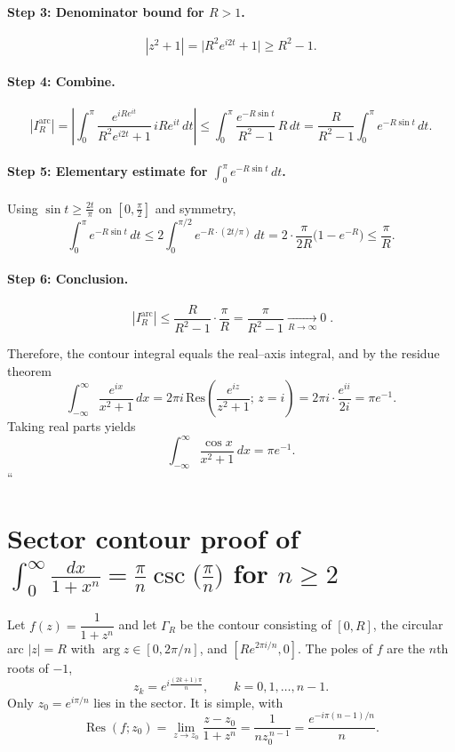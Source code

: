 \documentclass[12pt,a4paper]{article}
\begin{document}
\paragraph{Step 3: Denominator bound for \(R>1\).}
\[
|z^{2}+1|=\bigl|R^{2}e^{i2t}+1\bigr|\ge R^{2}-1 .
\]

\paragraph{Step 4: Combine.}
\[
\left|I_R^{\mathrm{arc}}\right|
=\left|\int_{0}^{\pi}\frac{e^{iRe^{it}}}{R^{2}e^{i2t}+1}\,iRe^{it}\,dt\right|
\le \int_{0}^{\pi}\frac{e^{-R\sin t}}{R^{2}-1}\,R\,dt
=\frac{R}{R^{2}-1}\int_{0}^{\pi} e^{-R\sin t}\,dt .
\]

\paragraph{Step 5: Elementary estimate for \(\int_{0}^{\pi}e^{-R\sin t}\,dt\).}
Using \(\sin t\ge \tfrac{2t}{\pi}\) on \([0,\tfrac{\pi}{2}]\) and symmetry,
\[
\int_{0}^{\pi}e^{-R\sin t}\,dt
\le 2\int_{0}^{\pi/2} e^{-R\cdot(2t/\pi)}\,dt
=2\cdot\frac{\pi}{2R}\bigl(1-e^{-R}\bigr)
\le \frac{\pi}{R}.
\]

\paragraph{Step 6: Conclusion.}
\[
\boxed{\;
	\left|I_R^{\mathrm{arc}}\right|
	\le \frac{R}{R^{2}-1}\cdot\frac{\pi}{R}
	=\frac{\pi}{R^{2}-1}\xrightarrow[R\to\infty]{}0\; }.
\]

Therefore, the contour integral equals the real–axis integral, and by the residue theorem
\[
\int_{-\infty}^{\infty}\frac{e^{ix}}{x^{2}+1}\,dx
=2\pi i\,\mathrm{Res}\!\left(\frac{e^{iz}}{z^{2}+1};\,z=i\right)
=2\pi i\cdot\frac{e^{ii}}{2i}
=\pi e^{-1}.
\]
Taking real parts yields
\[
\int_{-\infty}^{\infty}\frac{\cos x}{x^{2}+1}\,dx=\pi e^{-1}.
\]
``

\section*{Sector contour proof of \(\displaystyle \int_{0}^{\infty}\frac{dx}{1+x^{n}}=\frac{\pi}{n}\csc\!\bigl(\frac{\pi}{n}\bigr)\) for \(n\ge2\)}

Let \(f(z)=\dfrac{1}{1+z^{n}}\) and let \(\Gamma_R\) be the contour consisting of
\([0,R]\), the circular arc \(|z|=R\) with \(\arg z\in[0,2\pi/n]\), and
\([Re^{2\pi i/n},0]\). The poles of \(f\) are the \(n\)th roots of \(-1\),
\[
z_k=e^{i\frac{(2k+1)\pi}{n}},\qquad k=0,1,\dots,n-1.
\]
Only \(z_0=e^{i\pi/n}\) lies in the sector. It is simple, with
\[
\operatorname{Res}(f;z_0)
=\lim_{z\to z_0}\frac{z-z_0}{1+z^{n}}
=\frac{1}{n z_0^{\,n-1}}
=\frac{e^{-i\pi(n-1)/n}}{n}.
\]
\end{document}
